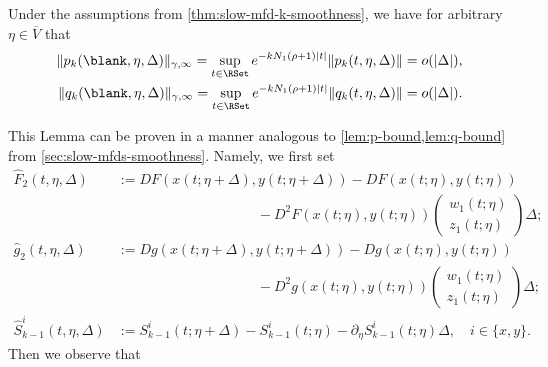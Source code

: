 \documentclass[a4paper]{siamart190516}
\begin{document}
 \begin{lemma}\label{lem:pqk-bounds}
 Under the assumptions from \cref{thm:slow-mfd-k-smoothness}, we have for
 arbitrary $\eta \in \overline{V}$ that
 \begin{align*}
\| p_k(\blank, \eta, \Delta) \|_{\gamma,\infty} = \sup_{t \in \RSet} e^{-kN_1(\rho+1)|t|}  \| p_k(t, \eta, \Delta)  \| &=  o(|\Delta|), \\
\| q_k(\blank, \eta, \Delta) \|_{\gamma,\infty} = \sup_{t \in \RSet} e^{-kN_1(\rho+1)|t|}  \| q_k(t, \eta, \Delta)  \| &=  o(|\Delta|).
\end{align*}
 \end{lemma}
 
This Lemma can be proven in a manner analogous to \cref{lem:p-bound,lem:q-bound} from
\cref{sec:slow-mfds-smoothness}. Namely, we first set
\begin{align*}
\hat{F}_2(t, \eta, \Delta) &:=  DF(x(t;\eta+\Delta),y(t;\eta+\Delta)) - DF(x(t;\eta),y(t;\eta)) \\
&\qquad \qquad \qquad \qquad \qquad   - D^2F(x(t;\eta),y(t;\eta))  \begin{pmatrix}  w_1(t; \eta)\\  z_1(t; \eta) \end{pmatrix} \Delta  ; \\
\hat{g}_2(t, \eta, \Delta) &:=  Dg(x(t;\eta+\Delta),y(t;\eta+\Delta)) - Dg(x(t;\eta),y(t;\eta)) \\
&\qquad \qquad \qquad \qquad \qquad     -  D^2g(x(t;\eta),y(t;\eta))   \begin{pmatrix}  w_1(t; \eta)\\  z_1(t; \eta) \end{pmatrix} \Delta    ;\\
\hat{S}^i_{k-1} (t, \eta, \Delta) &:= S^i_{k-1}(t;\eta+\Delta) - S^i_{k-1}(t;\eta) - \partial_{\eta} S^i_{k-1}(t;\eta) \Delta, \quad i \in \{x,y\}.
\end{align*}
Then we observe that
\end{document}
